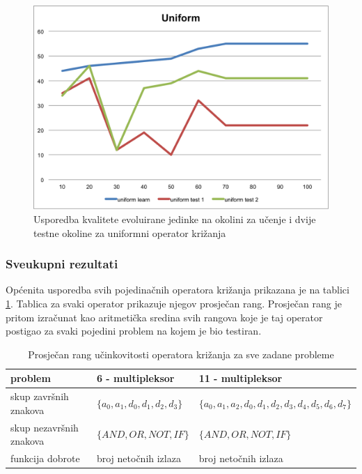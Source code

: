 \begin{figure}[H]
	\centering
	\includegraphics[scale=0.8]{./slike/cross-validation/uniform.png}
	\caption{Usporedba kvalitete evoluirane jedinke na okolini za učenje i dvije testne okoline za uniformni operator križanja}
	\label{uniform}
\end{figure}


\subsubsection{Sveukupni rezultati}
Općenita usporedba svih pojedinačnih operatora križanja prikazana je na tablici \ref{overAllTable}. Tablica za svaki operator prikazuje njegov prosječan rang. Prosječan rang je pritom izračunat kao aritmetička sredina svih rangova koje je taj operator postigao za svaki pojedini problem na kojem je bio testiran.

\begin{table}[H]
 	\centering

    \begin{tabular}{| l | l | l |}
    \hline
   problem & 6 - multipleksor & 11 - multipleksor \\ \hline
   skup završnih znakova & $\{a_0, a_1, d_0, d_1, d_2, d_3 \}$ & $\{a_0, a_1, a_2, d_0, d_1, d_2, d_3, d_4, d_5, d_6, d_7 \}$\\ \hline
   skup nezavršnih znakova & $\{ AND, OR, NOT, IF \}$  & $\{ AND, OR, NOT, IF \}$ \\ \hline
   funkcija dobrote & broj netočnih izlaza & broj netočnih izlaza \\ \hline
    \end{tabular}
    
    \caption{Prosječan rang učinkovitosti operatora križanja za sve zadane probleme}
    \label{overAllTable}
\end{table}


